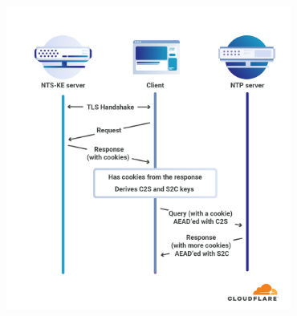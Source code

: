 \documentclass[11pt]{article}
\begin{document}
\begin{center}
\includegraphics[height=10cm]{gorseller/cloudflare-nts.png}
\end{center}
\end{document}
